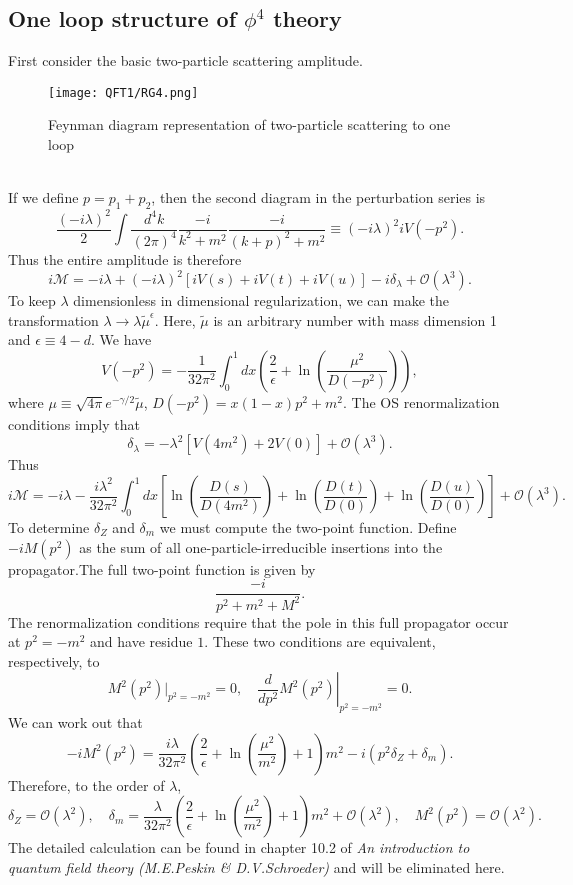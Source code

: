 \subsection{One loop structure of $\phi^4$ theory}
First consider the basic two-particle scattering amplitude.
\begin{figure}[!h]
\centering
\texttt{[image: QFT1/RG4.png]}
\caption{Feynman diagram representation of two-particle scattering to one loop}
\end{figure}
\\
If we define $p = p_1 + p_2$, then the second diagram in the perturbation series is
\[\frac{(-i\lambda)^2}{2} \int \frac{d^4k}{(2\pi)^4} \frac{-i}{k^2+m^2} \frac{-i}{(k+p)^2+m^2} \equiv (-i\lambda)^2 iV(-p^2).\]
Thus the entire amplitude is therefore
\[i\mathcal{M} = -i\lambda + (-i\lambda)^2 [iV(s) + iV(t) + iV(u)] -i\delta_{\lambda} + \mathcal{O}(\lambda^3).\] 
To keep $\lambda$ dimensionless in dimensional regularization, we can make the transformation $\lambda \to \lambda \tilde{\mu}^{\epsilon}$. Here, $\tilde{\mu}$ is an arbitrary number with mass dimension 1 and $\epsilon \equiv 4-d$. We have
\[V(-p^2) = -\frac{1}{32\pi^2} \int_0^1 dx \left(\frac{2}{\epsilon} + \ln\left(\frac{\mu^2}{D(-p^2)}\right)\right),\]
where $\mu \equiv  \sqrt{4\pi} e^{-\gamma/2} \tilde{\mu}$, $D(-p^2) = x(1-x)p^2+m^2$.
The OS renormalization conditions imply that
\[\delta_{\lambda} = -\lambda^2[V(4m^2)+2V(0)] + \mathcal{O}(\lambda^3).\]
Thus
\[i\mathcal{M} = -i\lambda -\frac{i\lambda^2}{32\pi^2} \int_0^1 dx \left[\ln\left(\frac{D(s)}{D(4m^2)}\right) +\ln\left(\frac{D(t)}{D(0)}\right)+\ln\left(\frac{D(u)}{D(0)}\right)\right] + \mathcal{O}(\lambda^3).\]
To determine $\delta_Z$ and $\delta_m$ we must compute the two-point function. Define $-iM(p^2)$ as the sum of all one-particle-irreducible insertions into the propagator.The full two-point function is given by
\[\frac{-i}{p^2 + m^2 + M^2}.\]
The renormalization conditions require that the pole in this full propagator occur at $p^2=-m^2$ and have residue $1$. These two conditions are equivalent, respectively, to
\[M^2(p^2)|_{p^2=-m^2} = 0 , \quad \left. \frac{d}{dp^2} M^2(p^2)\right|_{p^2=-m^2} =0.\]
We can work out that
\[-iM^2(p^2) = \frac{i\lambda}{32\pi^2}\left(\frac{2}{\epsilon} + \ln\left(\frac{\mu^2}{m^2}\right)+1\right)m^2 -i(p^2\delta_Z + \delta_m).\]
Therefore, to the order of $\lambda$, 
\[\delta_Z=\mathcal{O}(\lambda^2) , \quad \delta_m = \frac{\lambda}{32\pi^2}\left(\frac{2}{\epsilon} + \ln\left(\frac{\mu^2}{m^2}\right)+1\right)m^2 + \mathcal{O}(\lambda^2) , \quad M^2(p^2) =\mathcal{O}(\lambda^2).\]
The detailed calculation can be found in chapter 10.2 of \emph{An introduction to quantum field theory (M.E.Peskin \& D.V.Schroeder)} and will be eliminated here.

